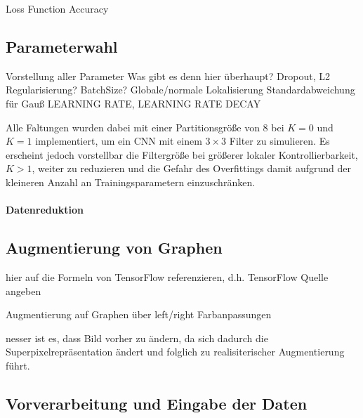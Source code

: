 Loss Function
Accuracy

\subsection{Parameterwahl}
\label{parameterwahl}

Vorstellung aller Parameter
Was gibt es denn hier überhaupt?
Dropout, L2 Regularisierung?
BatchSize?
Globale/normale Lokalisierung
Standardabweichung für Gauß
LEARNING RATE, LEARNING RATE DECAY

Alle Faltungen wurden dabei mit einer Partitionsgröße von $8$ bei $K=0$ und $K=1$ implementiert, um ein \gls{CNN} mit einem $3 \times 3$ Filter zu simulieren.
Es erscheint jedoch vorstellbar die Filtergröße bei größerer lokaler Kontrollierbarkeit, \dhe{} $K > 1$, weiter zu reduzieren und die Gefahr des Overfittings damit aufgrund der kleineren Anzahl an Trainingsparametern einzuschränken.

\paragraph{Datenreduktion}
\label{datenreduktion}

\subsection{Augmentierung von Graphen}
\label{augmentierung_von_graphen}

hier auf die Formeln von TensorFlow referenzieren, d.h. TensorFlow Quelle angeben
\cite{tensorflow}

Augmentierung auf Graphen über left/right
Farbanpassungen


nesser ist es, dass Bild vorher zu ändern, da sich dadurch die Superpixelrepräsentation ändert
und folglich zu realisiterischer Augmentierung führt.

\subsection{Vorverarbeitung und Eingabe der Daten}
\label{vorverarbeitung}
